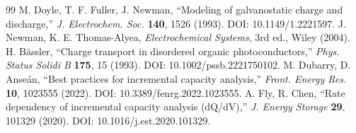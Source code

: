\documentclass[11pt,a4paper]{article}
\begin{document}
\begin{thebibliography}{99}
 M. Doyle, T. F. Fuller, J. Newman, ``Modeling of galvanostatic
  charge and discharge,'' \emph{J. Electrochem. Soc.} \textbf{140}, 1526 (1993). DOI:
  10.1149/1.2221597.
 J. Newman, K. E. Thomas-Alyea, \emph{Electrochemical Systems}, 3rd ed.,
  Wiley (2004).
 H. Bässler, ``Charge transport in disordered organic
  photoconductors,'' \emph{Phys. Status Solidi B} \textbf{175}, 15 (1993). DOI:
  10.1002/pssb.2221750102.
 M. Dubarry, D. Anseán, ``Best practices for incremental capacity
  analysis,'' \emph{Front. Energy Res.} \textbf{10}, 1023555 (2022). DOI:
  10.3389/fenrg.2022.1023555.
 A. Fly, R. Chen, ``Rate dependency of incremental capacity analysis
  (dQ/dV),'' \emph{J. Energy Storage} \textbf{29}, 101329 (2020). DOI:
  10.1016/j.est.2020.101329.
\end{thebibliography}
\end{document}
